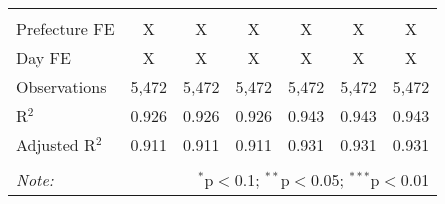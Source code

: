 \begin{table}[!htbp]
\begin{tabular}{@{\extracolsep{5pt}}lcccccc}
  & & & & & & \\ 
\hline \\[-1.8ex] 
Prefecture FE & X & X & X & X & X & X \\ 
Day FE & X & X & X & X & X & X \\ 
Observations & 5,472 & 5,472 & 5,472 & 5,472 & 5,472 & 5,472 \\ 
R$^{2}$ & 0.926 & 0.926 & 0.926 & 0.943 & 0.943 & 0.943 \\ 
Adjusted R$^{2}$ & 0.911 & 0.911 & 0.911 & 0.931 & 0.931 & 0.931 \\ 
\hline 
\hline \\[-1.8ex] 
\textit{Note:}  & \multicolumn{6}{r}{$^{*}$p$<$0.1; $^{**}$p$<$0.05; $^{***}$p$<$0.01} \\ 
\end{tabular} 
\end{table} 
